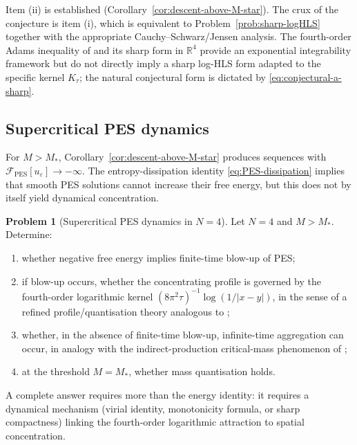\documentclass[11pt,reqno]{amsart}
\theoremstyle{definition}
\newtheorem{problem}[theorem]{Problem}
\theoremstyle{remark}
\newcommand{\R}{\mathbb{R}}
\newcommand{\Free}{\mathcal{F}}
\begin{document}
Item (ii) is established (Corollary~\ref{cor:descent-above-M-star}). The crux of the conjecture is item (i), which is equivalent to Problem~\ref{prob:sharp-logHLS} together with the appropriate Cauchy--Schwarz/Jensen analysis. The fourth-order Adams inequality of \cite{adams1988sharp} and its sharp form in $\R^{4}$ \cite{lam2012sharp} provide an exponential integrability framework but do not directly imply a sharp log-HLS form adapted to the specific kernel $K_\tau$; the natural conjectural form is dictated by \eqref{eq:conjectural-a-sharp}.

\subsection{Supercritical PES dynamics}
\label{subsec:supercritical-dynamics}

For $M>M_{\!*}$, Corollary~\ref{cor:descent-above-M-star} produces sequences with $\Free_{\mathrm{PES}}[u_\varepsilon]\to -\infty$. The entropy-dissipation identity \eqref{eq:PES-dissipation} implies that smooth PES solutions cannot increase their free energy, but this does not by itself yield dynamical concentration.

\begin{problem}[Supercritical PES dynamics in $N=4$]\label{prob:PES-dynamics}
Let $N=4$ and $M>M_{\!*}$. Determine:
\begin{enumerate}[label=(\roman*),leftmargin=2em]
\item whether negative free energy implies finite-time blow-up of PES;
\item if blow-up occurs, whether the concentrating profile is governed by the fourth-order logarithmic kernel $(8\pi^{2}\tau)^{-1}\log(1/|x-y|)$, in the sense of a refined profile/quantisation theory analogous to \cite{raphael2014stability};
\item whether, in the absence of finite-time blow-up, infinite-time aggregation can occur, in analogy with the indirect-production critical-mass phenomenon of \cite{tao2017critical};
\item at the threshold $M=M_{\!*}$, whether mass quantisation holds.
\end{enumerate}
\end{problem}

A complete answer requires more than the energy identity: it requires a dynamical mechanism (virial identity, monotonicity formula, or sharp compactness) linking the fourth-order logarithmic attraction to spatial concentration.
\end{document}
